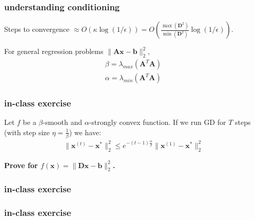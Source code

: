 \documentclass[compress]{beamer}
\newcommand{\bv}[1]{\mathbf{#1}}
\begin{document}
\begin{frame}[t]
	\frametitle{understanding conditioning}
	Steps to convergence $\approx O\left(\kappa \log(1/\epsilon)\right) = O\left(\frac{\max(\bv{D}^2)}{\min(\bv{D}^2)}  \log(1/\epsilon)\right) $.
	
	For general regression problems $\|\bv{A}\bv{x} - \bv{b}\|_2^2$,
	\begin{align*}
		\beta = \lambda_{max}(\bv{A}^T\bv{A}) \\
		\alpha = \lambda_{min}(\bv{A}^T\bv{A})
	\end{align*}
\end{frame}


\begin{frame}[t]
	\frametitle{in-class exercise}
		\begin{theorem}
		Let $f$ be a $\beta$-smooth and $\alpha$-strongly convex function. If we run GD for $T$ steps (with step size $\eta = \frac{1}{\beta}$) we have:
		\begin{align*}
		\|\bv{x}^{(t)} - \bv{x}^*\|_2^2 \leq e^{-(t-1)\frac{\alpha}{\beta}} \|\bv{x}^{(1)} - \bv{x}^*\|_2^2
		\end{align*} 
	\end{theorem}

\begin{center}
	\alert{\textbf{Prove for $f(\bv{x}) = \|\bv{D}\bv{x} - \bv{b}\|_2^2$.}}
\end{center}	
	
\end{frame} 

\begin{frame}[t]
	\frametitle{in-class exercise}
\end{frame}

\begin{frame}[t]
	\frametitle{in-class exercise}
\end{frame}
\end{document}
